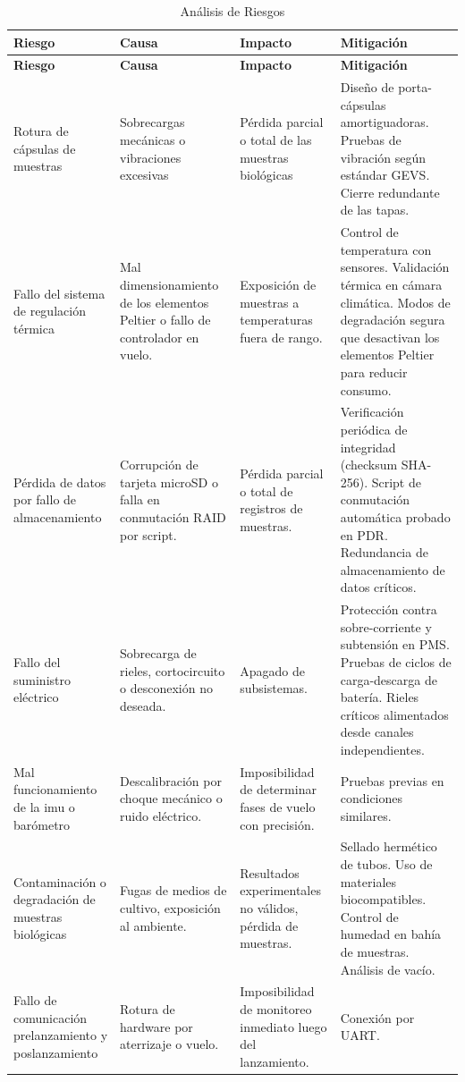     \begin{longtable}{ | m{2.5cm} | m{3cm} | m{3cm} | m{6cm} | }
      \caption{Análisis de Riesgos} \label{tab:analisis_riesgos} \\
      \hline
      \textbf{Riesgo} & \textbf{Causa} & \textbf{Impacto} & \textbf{Mitigación} \\
      \hline
      \endfirsthead

      \hline
      \textbf{Riesgo} & \textbf{Causa} & \textbf{Impacto} & \textbf{Mitigación} \\
      \hline
      \endhead

      \hline
      \endfoot

      \hline
      \endlastfoot

      Rotura de cápsulas de muestras & Sobrecargas mecánicas o vibraciones excesivas & Pérdida parcial o total de las muestras biológicas & Diseño de porta-cápsulas amortiguadoras. Pruebas de vibración según estándar GEVS. Cierre redundante de las tapas. \\
      \hline
      Fallo del sistema de regulación térmica & Mal dimensionamiento de los elementos Peltier o fallo de controlador en vuelo. & Exposición de muestras a temperaturas fuera de rango. & Control de temperatura con sensores. Validación térmica en cámara climática. Modos de degradación segura que desactivan los elementos Peltier para reducir consumo. \\
      \hline
      Pérdida de datos por fallo de almacenamiento & Corrupción de tarjeta microSD o falla en conmutación RAID por script. & Pérdida parcial o total de registros de muestras. & Verificación periódica de integridad (checksum SHA-256). Script de conmutación automática probado en PDR. Redundancia de almacenamiento de datos críticos. \\
      \hline
      Fallo del suministro eléctrico & Sobrecarga de rieles, cortocircuito o desconexión no deseada. & Apagado de subsistemas. & Protección contra sobre-corriente y subtensión en PMS. Pruebas de ciclos de carga-descarga de batería. Rieles críticos alimentados desde canales independientes. \\
      \hline
      Mal funcionamiento de la imu o barómetro & Descalibración por choque mecánico o ruido eléctrico. & Imposibilidad de determinar fases de vuelo con precisión. & Pruebas previas en condiciones similares. \\
      \hline
      Contaminación o degradación de muestras biológicas & Fugas de medios de cultivo, exposición al ambiente. & Resultados experimentales no válidos, pérdida de muestras. & Sellado hermético de tubos. Uso de materiales biocompatibles. Control de humedad en bahía de muestras. Análisis de vacío. \\
      \hline
      Fallo de comunicación prelanzamiento y poslanzamiento  & Rotura de hardware por aterrizaje o vuelo. & Imposibilidad de monitoreo inmediato luego del lanzamiento. & Conexión por UART. \\
      \hline
    \end{longtable}

